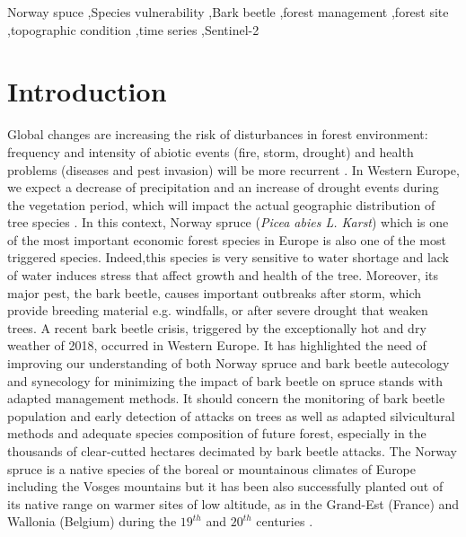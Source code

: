 \documentclass[3p,procedia]{elsarticle}
\begin{document}
\begin{frontmatter}
\begin{abstract}
\fi
\end{abstract}

\begin{keyword}
  Norway spuce \sep Species vulnerability \sep Bark beetle \sep forest management \sep forest site \sep topographic condition \sep time series \sep Sentinel-2
\end{keyword}

\end{frontmatter}

\linenumbers

\section{Introduction}

Global changes are increasing the risk of disturbances in forest environment: frequency and intensity of abiotic events (fire, storm, drought) and health problems (diseases and pest invasion) will be more recurrent \citep{lindner_climate_2010}.
In Western Europe, we expect a decrease of precipitation and an increase of drought events during the vegetation period, which will impact the actual geographic distribution of tree species \citep{hanewinkel2013climate}.
In this context, Norway spruce (\textit{Picea abies L. Karst}) which is one of the most important economic forest species in Europe \citep{nystedt_norway_2013} is also one of the most triggered species.
Indeed,this species is very sensitive to water shortage  \citep{tjoelker_outline_2007} and lack of water induces stress that affect growth and health of the tree.
Moreover, its major pest, the bark beetle, causes important outbreaks after storm, which provide breeding material e.g. windfalls, or after severe drought that weaken trees.
A recent bark beetle crisis, triggered by the exceptionally hot and dry weather of 2018, occurred in Western Europe. 
It has highlighted the need of improving our understanding of both Norway spruce and bark beetle autecology and synecology for minimizing the impact of bark beetle on spruce stands with adapted management methods.
It should concern the monitoring of bark beetle population and early detection of attacks on trees as well as adapted silvicultural methods and adequate species composition of future forest, especially in the thousands of clear-cutted hectares decimated by bark beetle attacks. 
The Norway spruce is a native species of the boreal or mountainous climates of Europe including the Vosges mountains but it has been also successfully planted out of its native range on warmer sites of low altitude, as in the Grand-Est (France) and Wallonia (Belgium) during the $19^{th}$ and $20^{th}$ centuries \citep{Noirfalise_1975,guinier_trois_1959}.
\end{document}
